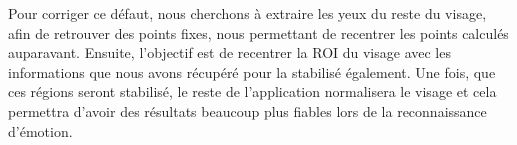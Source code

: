 Pour corriger ce défaut, nous cherchons à extraire les yeux du reste du visage, afin 
de retrouver des points fixes, nous permettant de recentrer les points calculés auparavant.
Ensuite, l'objectif est de recentrer la ROI du visage avec les informations que
nous avons récupéré pour la stabilisé également.  Une fois, que ces
régions seront stabilisé, le reste de l'application normalisera le
visage et cela permettra d'avoir des résultats beaucoup plus fiables lors de la
reconnaissance d'émotion.\\

% 
% 
% 
\newpage
